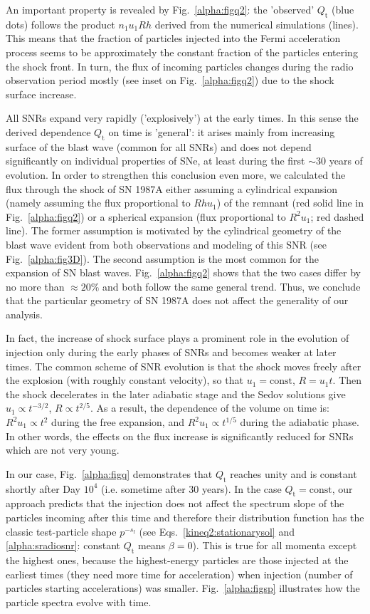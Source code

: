 \documentclass{aa}
\newcommand\rs[1]{_\mathrm{#1}}
\begin{document}
An important property is revealed by Fig.~\ref{alpha:figq2}: the 'observed' $Q\rs{t}$ (blue dots) follows the product $n_1u_1Rh$ derived from the numerical simulations (lines). This means that the fraction of particles injected into the Fermi acceleration process seems to be approximately the constant fraction of the particles entering the shock front. In turn, the flux of incoming particles changes during the radio observation period mostly (see inset on Fig.~\ref{alpha:figq2}) due to the shock surface increase. 

All SNRs expand very rapidly ('explosively') at the early times. In this sense the derived dependence $Q\rs{t}$ on time is 'general': it arises mainly from increasing surface of the blast wave (common for all SNRs) and does not depend significantly on individual
properties of SNe, at least during the first $\sim 30$ years of
evolution. In order to strengthen this conclusion even more, we
calculated the flux through the shock of SN 1987A either assuming
a cylindrical expansion (namely assuming the flux proportional to
$R h u_1$) of the remnant (red solid line in Fig.~\ref{alpha:figq2}) or a spherical
expansion (flux proportional to $R^2 u_1$; red dashed line). The
former assumption is motivated by the cylindrical geometry of the
blast wave evident from both observations and modeling of this SNR
(see Fig.~\ref{alpha:fig3D}). The second assumption is the most common for
the expansion of SN blast waves. Fig.~\ref{alpha:figq2} shows that the two cases
differ by no more than $\approx 20\%$ and both follow the same
general trend. Thus, we conclude that the particular geometry of
SN 1987A does not affect the generality of our analysis.

In fact, the increase of shock surface plays a prominent role in
the evolution of injection only during the early phases of SNRs and
becomes weaker at later times. The common scheme of SNR evolution
is that the shock moves freely after the explosion (with roughly
constant velocity), so that $u_1=\textrm{const}$, $R=u_1t$. Then
the shock decelerates in the later adiabatic stage and the Sedov
solutions give $u_1\propto t^{-3/2}$, $R\propto t^{2/5}$. As
a result, the dependence of the volume on time is: $R^2u_1\propto t^{2}$ 
during the free expansion, and $R^2u_1\propto t^{1/5}$ during
the adiabatic phase. In other words, the effects on the flux
increase is significantly reduced for SNRs which are not very young.

In our case, Fig.~\ref{alpha:figq} demonstrates that $Q\rs{t}$ reaches unity and is constant shortly after Day $10^4$ (i.e. sometime after $30$ years). In the case $Q\rs{t}=\textrm{const}$, our approach predicts that the injection does not affect  the spectrum slope of the particles incoming after this time and therefore their distribution function has the classic test-particle shape $p^{-s\rs{f}}$ (see Eqs.~\ref{kineq2:stationarysol} and \ref{alpha:sradiosnr}: constant $Q\rs{t}$ means $\beta=0$).
This is true for all momenta except the highest
ones, because the highest-energy particles are those injected at
the earliest times (they need more time for acceleration) when
injection (number of particles starting accelerations) was smaller. 
Fig.~\ref{alpha:figsp} illustrates how the particle spectra evolve with time.
\end{document}
